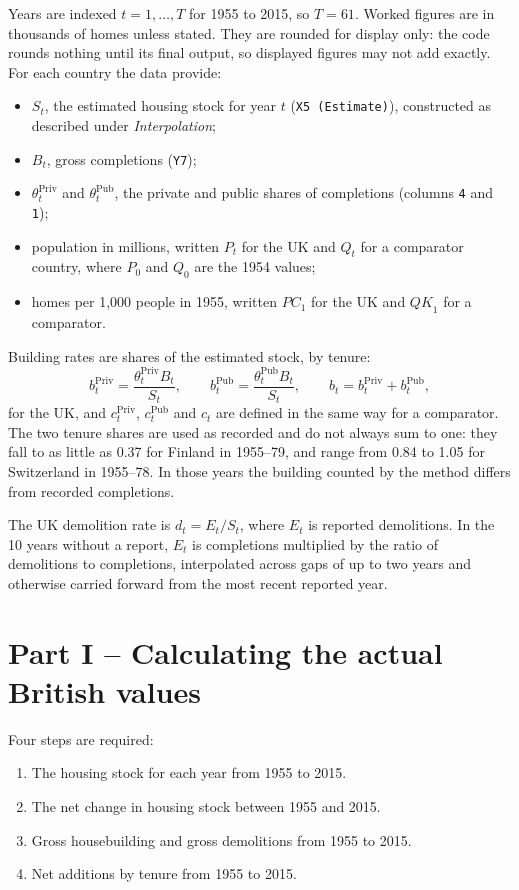 \documentclass[11pt,a4paper]{article}
\newcommand{\priv}{\mathrm{Priv}}
\newcommand{\pub}{\mathrm{Pub}}
\newcommand{\PC}{\mathit{PC}}
\newcommand{\QK}{\mathit{QK}}
\newcommand{\code}[1]{\texttt{#1}}
\begin{document}
Years are indexed $t = 1, \dots, T$ for 1955 to 2015, so $T = 61$. Worked figures are in
thousands of homes unless stated. They are rounded for display only: the code rounds
nothing until its final output, so displayed figures may not add exactly. For each
country the data provide:
\begin{itemize}
  \item $S_t$, the estimated housing stock for year $t$ (\code{X5 (Estimate)}),
        constructed as described under \emph{Interpolation};
  \item $B_t$, gross completions (\code{Y7});
  \item $\theta_t^{\priv}$ and $\theta_t^{\pub}$, the private and public shares of
        completions (columns \code{4} and \code{1});
  \item population in millions, written $P_t$ for the UK and $Q_t$ for a comparator
        country, where $P_0$ and $Q_0$ are the 1954 values;
  \item homes per 1{,}000 people in 1955, written $\PC_1$ for the UK and $\QK_1$ for a
        comparator.
\end{itemize}
Building rates are shares of the estimated stock, by tenure:
\[
  b_t^{\priv} = \frac{\theta_t^{\priv} B_t}{S_t}, \qquad
  b_t^{\pub}  = \frac{\theta_t^{\pub} B_t}{S_t}, \qquad
  b_t = b_t^{\priv} + b_t^{\pub},
\]
for the UK, and $c_t^{\priv}$, $c_t^{\pub}$ and $c_t$ are defined in the same way for a
comparator. The two tenure shares are used as recorded and do not always sum to one: they
fall to as little as 0.37 for Finland in 1955--79, and range from 0.84 to 1.05 for
Switzerland in 1955--78. In those years the building counted by the method differs from
recorded completions.

The UK demolition rate is $d_t = E_t / S_t$, where $E_t$ is reported demolitions. In the
10 years without a report, $E_t$ is completions multiplied by the ratio of demolitions to
completions, interpolated across gaps of up to two years and otherwise carried forward
from the most recent reported year.

\section*{Part I -- Calculating the actual British values}

Four steps are required:
\begin{enumerate}
  \item The housing stock for each year from 1955 to 2015.
  \item The net change in housing stock between 1955 and 2015.
  \item Gross housebuilding and gross demolitions from 1955 to 2015.
  \item Net additions by tenure from 1955 to 2015.
\end{enumerate}
\end{document}
